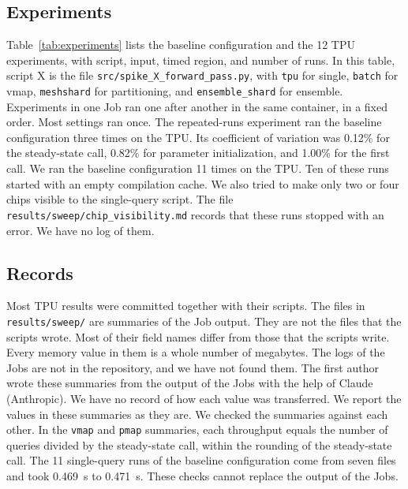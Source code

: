 \subsection{Experiments}\label{sec:experiments}
\begin{table}[t]
\caption{\capTabExperiments}\label{tab:experiments}
\centering\small\setlength{\tabcolsep}{4pt}
\end{table}

Table~\ref{tab:experiments} lists the baseline configuration and the 12 TPU experiments, with script, input, timed region, and number of runs. %
In this table, script X is the file \texttt{src/spike\_X\_forward\_pass.py}, with \texttt{tpu} for single,
\texttt{batch} for vmap, \texttt{meshshard} for partitioning, and \texttt{ensemble\_shard} for ensemble.
Experiments in one Job ran one after another in the same container, in a fixed order. Most settings ran once. The
repeated-runs experiment ran the baseline configuration three times on the TPU. Its coefficient of variation was 0.12\% for the steady-state call, 0.82\% for parameter initialization, and 1.00\% for the first call. %
We ran the baseline configuration 11 times on the TPU. Ten of these runs started with an empty compilation cache. %
We also tried to make only two or four chips visible to the single-query script.
The file \texttt{results/sweep/chip\_visibility.md} records that these runs stopped with an error. We have no log of them. %

\subsection{Records}\label{sec:records}
Most TPU results were committed together with their scripts. The files in \texttt{results/sweep/} are summaries of the
Job output. They are not the files that the scripts wrote. Most of their field names differ from those that the
scripts write. Every memory value in them is a whole number of megabytes. %
The logs of the Jobs are not in the repository, and we have not found them. The first author wrote these summaries
from the output of the Jobs with the help of Claude (Anthropic). We have no record of how each value was transferred. We
report the values in these summaries as they are. We checked the summaries against each other. In the \texttt{vmap}
and \texttt{pmap} summaries, each throughput equals the number of queries divided by the steady-state call, within the
rounding of the steady-state call.
The 11 single-query runs of the baseline configuration come from seven files and took 0.469~s to 0.471~s. %
These checks cannot replace the output of the Jobs.
